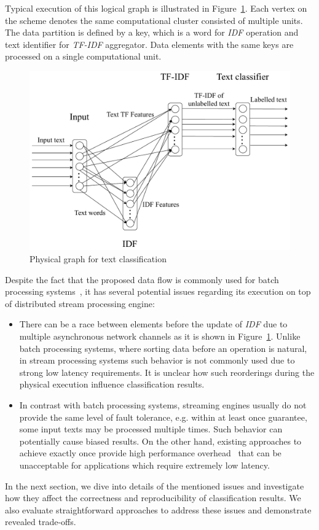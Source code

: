 Typical execution of this logical graph is illustrated in Figure~\ref{physical_graph}. Each vertex on the scheme denotes the same computational cluster consisted of multiple units. The data partition is defined by a key, which is a word for {\em IDF} operation and text identifier for {\em TF-IDF} aggregator. Data elements with the same keys are processed on a single computational unit.

\begin{figure}[htbp]
  \centering
  \includegraphics[scale=0.375]{pics/physical-graph-no-part-fit}
  \caption{Physical graph for text classification}
  \label {physical_graph}
\end{figure}

Despite the fact that the proposed data flow is commonly used for batch processing systems~\cite{semberecki2016distributed}, it has several potential issues regarding its execution on top of distributed stream processing engine:

\begin{itemize}
    \item There can be a race between elements before the update of {\em IDF} due to multiple asynchronous network channels as it is shown in Figure~\ref{physical_graph}. Unlike batch processing systems, where sorting data before an operation is natural, in stream processing systems such behavior is not commonly used due to strong low latency requirements. It is unclear how such reorderings during the physical execution influence classification results.
    \item In contrast with batch processing systems, streaming engines usually do not provide the same level of fault tolerance, e.g. within at least once guarantee, some input texts may be processed multiple times. Such behavior can potentially cause biased results. On the other hand, existing approaches to achieve exactly once provide high performance overhead~\cite{we2018beyondmr} that can be unacceptable for applications which require extremely low latency.
\end{itemize}

In the next section, we dive into details of the mentioned issues and investigate how they affect the correctness and reproducibility of classification results. We also evaluate straightforward approaches to address these issues and demonstrate revealed trade-offs.